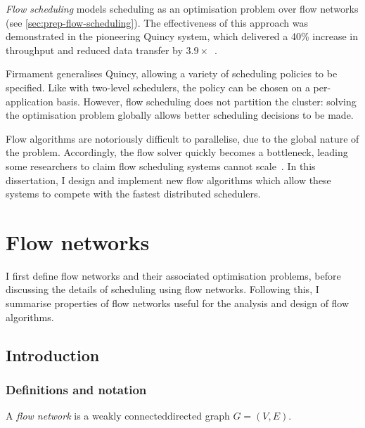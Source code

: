 
\emph{Flow scheduling} models scheduling as an optimisation problem over flow networks (see \cref{sec:prep-flow-scheduling}). The effectiveness of this approach was demonstrated in the pioneering Quincy system, which delivered a 40\% increase in throughput and reduced data transfer by $3.9\times$~\cite{Isard:2009}. 

Firmament generalises Quincy, allowing a variety of scheduling policies to be specified. Like with two-level schedulers, the policy can be chosen on a per-application basis. However, flow scheduling does not partition the cluster: solving the optimisation problem globally allows better scheduling decisions to be made.

Flow algorithms are notoriously difficult to parallelise, due to the global nature of the problem. Accordingly, the flow solver quickly becomes a bottleneck, leading some researchers to claim flow scheduling systems cannot scale~\cite[\S6]{Apollo}. In this dissertation, I design and implement new flow algorithms which allow these systems to compete with the fastest distributed schedulers.

\section{Flow networks} \label{sec:prep-flow}

I first define flow networks and their associated optimisation problems, before discussing the details of scheduling using flow networks. Following this, I summarise properties of flow networks useful for the analysis and design of flow algorithms.

\subsection{Introduction}


\subsubsection{Definitions and notation}

A \emph{flow network} is a weakly connected\footnotemark directed graph $G=(V,E)$.

